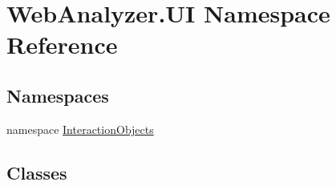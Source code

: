 \hypertarget{namespace_web_analyzer_1_1_u_i}{}\section{Web\+Analyzer.\+U\+I Namespace Reference}
\label{namespace_web_analyzer_1_1_u_i}
\subsection*{Namespaces}
\begin{DoxyCompactItemize}
\item 
namespace \hyperlink{namespace_web_analyzer_1_1_u_i_1_1_interaction_objects}{Interaction\+Objects}
\end{DoxyCompactItemize}
\subsection*{Classes}
